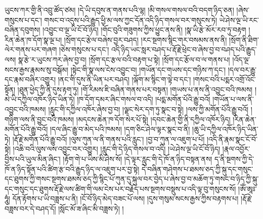 ཡུངས་ཀར་གྱི་ནི་འབྲུ་ཚོད་ཙམ། །དེ་ཡི་དབུས་ན་གནས་པའི་ལྷ། །མི་གསལ་གསལ་བའི་བདག་ཉིད་ཅན། །ཞེས་གསུངས་པ་དང་། གསང་བ་འདུས་པའི་རྒྱུད་ཕྱི་མ་ལས་ཀྱང་དོན་འདི་ཉིད་གསལ་བར་གསུངས་ཏེ། ཡེ་ཤེས་ལྔ་ཡི་རང་བཞིན་དབུགས། །འབྱུང་བ་ལྔ་ཡི་ངོ་བོ་ཉིད། །གོང་བུའི་གཟུགས་ཀྱིས་ཕྱུང་ནས་ནི། །སྣ་ཡི་རྩེ་མོར་རབ་ཏུ་བརྟག །རིན་ཆེན་ཁ་དོག་སྣ་ལྔ་པ། །སྲོག་དང་རྩེལ་བཞེས་བྱར་བཤད། །རང་སྔགས་སྙིང་གར་བསམས་ནས་ནི། །སྲོག་ནི་ཐིག་ལེར་གནས་པར་གཞག །ཅེས་གསུངས་པ་དང་། འདི་ཉིད་ཡང་སླར་བཤད་པ་རྡོ་རྗེ་ཕྲེང་བ་ཞེས་བྱ་བ་བཤད་པའི་རྒྱུད་ལས། སྣ་རྩེ་ར་ཡུངས་ཀར་ཞེས་བྱ་བ། །སྲོག་དང་རྩལ་བའི་བརྟག་པ་སྟེ། །སྲོག་དང་རྩོལ་བ་ལ་གནས་པ། །འོད་ལྔ་སངས་རྒྱས་རྣམས་སུ་བསྒོམ། །སྟེང་གི་སྣ་ལས་ངེས་འབྱུང་བ། །གཡོན་དང་གཡས་དང་གཉིས་ཀ་དང་། །དལ་བར་རྒྱུ་དང་རྣམ་བཞིར་འགྱུར། །ནང་གི་དུས་ནི་ཡིན་པར་བཤད། །ལྐོག་མ་སྙིང་ག་ལྟེ་བ་དང་། །གསང་བའི་པདྨར་འགྲོ་འོང་སྟོན། །ཐུན་ཕྱེད་ཀྱི་ནི་དུས་རྟག་ཏུ། །གོ་རིམས་ཇི་བཞིན་གནས་པར་བསྟན། །གཡས་པ་ནས་ནི་འབྱུང་བའི་ཁམས། །མེ་ཡི་དཀྱིལ་འཁོར་ཉིད་ཡིན་ཏེ། །ཁ་དོག་དམར་ཞིང་གསལ་བ་འདི། །པདྨ་མགོན་པོའི་རྒྱུ་བའོ། །གཡོན་པ་ལས་ནི་འབྱུང་བའི་ཁམས། །རླུང་གི་དཀྱིལ་འཁོར་ཞེས་བྱ་བ། །ལྗང་སེར་དག་ཏུ་སྣང་བ་སྟེ། །ལས་ཀྱི་མགོན་པོའི་རྒྱུ་བའོ། །གཉིག་ལས་ནི་བྱུང་བའི་ཁམས། །མདངས་ཆེན་ཁ་དོག་སེར་པོ་སྟེ། །དབང་ཆེན་གྱི་ནི་དཀྱིལ་འཁོར་ཉིད། །རིན་ཆེན་མགོན་པོའི་རྒྱུ་བའོ། །དལ་ཞིང་རྒྱུ་བ་མེད་པའི་ཁམས། །དག་ཅིང་ཤེལ་ལྟར་སྣང་བ་ནི། །ཆུ་ཡི་དཀྱིལ་འཁོར་ཉིད་ཡིན་ཏེ། །རྡོ་རྗེ་མགོན་པོའི་རྒྱུ་བའོ། །ལུས་ཀུན་ལ་ནི་གནས་པའི་རླུང་། །བྱ་བ་ཀུན་ལ་འཇུག་པ་པོ། །འདི་ནི་རྣམ་སྣང་ངོ་བོ་སྟེ། །འཆི་བའི་ལུས་ལས་འབྱུང་བར་འགྱུར། །རླུང་གི་དེ་ཉིད་གསལ་བ་འདི། །ཡེ་ཤེས་ལྔ་ཡི་ངོ་བོ་ཉིད། །རྣལ་འབྱོར་བྱིས་པའི་ཡུལ་མིན་ཞིང་། །རྟོག་གེ་པ་ཡིས་མི་ཤེས་སོ། །དེ་ལྟར་རླུང་གི་དེ་ཁོ་ན་ཉིད་བསྟན་ནས། ད་ནི་སྔགས་ཀྱི་དེ་ཁོ་ན་ཉིད་སྟོན་པའི་ཚིག་རྩ་བའི་རྒྱུད་ཉིད་ལ་འཇུག་པར་བྱ་སྟེ། དེ་བཞིན་གཤེགས་པ་ཐམས་ཅད་ཀྱི་སྐུ་དང་གསུང་དང་ཐུགས་ཀྱི་གསང་སྔགས་ཐམས་ཅད་ཀྱི་སྙིང་པོ་ཀུན་དུ་སྐུལ་བར་བྱེད་པ་ཞེས་བྱ་བ་མཆོག་ཏུ་གསང་བ་ཉིད་ཀྱི་སྐུ་དང་གསུང་དང་ཐུགས་རྡོ་རྗེ་ལས་ཚིག་གི་ལམ་ངེས་པར་བརྗོད་པས་སྔགས་བསྡུས་པ་འདི་ལྟ་བུ་གསུངས་སོ། །ཨོཾ་ཨཱཿ་ཧཱུཾ། དོན་རྟོགས་པ་ཡི་བཟླས་པ་ནི། །ངོ་བོ་ཉིད་མེད་བཟང་པོ་ལས། །དུས་གསུམ་སངས་རྒྱས་ཀྱིས་བརྟགས་པ། །རྡོ་རྗེ་བཟླས་བར་དེ་བཤད་དོ། །སློང་མོ་ཟ་ཞིང་མི་བཟླས་ཏེ། །
